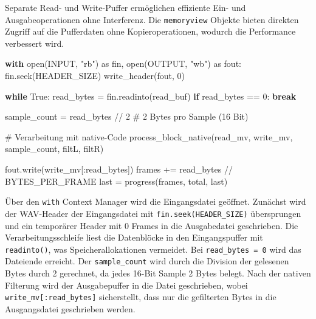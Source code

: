 \documentclass[
  ngerman,
  letterpaper,
  DIV=11]{scrreprt}
\newenvironment{Shaded}{\begin{snugshade}}{\end{snugshade}}
\newcommand{\BuiltInTok}[1]{\textcolor[rgb]{0.00,0.23,0.31}{#1}}
\newcommand{\CommentTok}[1]{\textcolor[rgb]{0.37,0.37,0.37}{#1}}
\newcommand{\ControlFlowTok}[1]{\textcolor[rgb]{0.00,0.23,0.31}{\textbf{#1}}}
\newcommand{\DecValTok}[1]{\textcolor[rgb]{0.68,0.00,0.00}{#1}}
\newcommand{\ImportTok}[1]{\textcolor[rgb]{0.00,0.46,0.62}{#1}}
\newcommand{\NormalTok}[1]{\textcolor[rgb]{0.00,0.23,0.31}{#1}}
\newcommand{\OperatorTok}[1]{\textcolor[rgb]{0.37,0.37,0.37}{#1}}
\newcommand{\StringTok}[1]{\textcolor[rgb]{0.13,0.47,0.30}{#1}}
\newcommand{\VariableTok}[1]{\textcolor[rgb]{0.07,0.07,0.07}{#1}}
\begin{document}
Separate Read- und Write-Puffer ermöglichen effiziente Ein- und
Ausgabeoperationen ohne Interferenz. Die \texttt{memoryview} Objekte
bieten direkten Zugriff auf die Pufferdaten ohne Kopieroperationen,
wodurch die Performance verbessert wird.

\begin{Shaded}
\begin{Highlighting}[]
\ControlFlowTok{with} \BuiltInTok{open}\NormalTok{(INPUT, }\StringTok{"rb"}\NormalTok{) }\ImportTok{as}\NormalTok{ fin, }\BuiltInTok{open}\NormalTok{(OUTPUT, }\StringTok{"wb"}\NormalTok{) }\ImportTok{as}\NormalTok{ fout:}
\NormalTok{    fin.seek(HEADER\_SIZE)}
\NormalTok{    write\_header(fout, }\DecValTok{0}\NormalTok{)}

    \ControlFlowTok{while} \VariableTok{True}\NormalTok{:}
\NormalTok{        read\_bytes }\OperatorTok{=}\NormalTok{ fin.readinto(read\_buf)}
        \ControlFlowTok{if}\NormalTok{ read\_bytes }\OperatorTok{==} \DecValTok{0}\NormalTok{:}
            \ControlFlowTok{break}

\NormalTok{        sample\_count }\OperatorTok{=}\NormalTok{ read\_bytes }\OperatorTok{//} \DecValTok{2}  \CommentTok{\# 2 Bytes pro Sample (16 Bit)}

        \CommentTok{\# Verarbeitung mit native{-}Code}
\NormalTok{        process\_block\_native(read\_mv, write\_mv, sample\_count, filtL, filtR)}

\NormalTok{        fout.write(write\_mv[:read\_bytes])}
\NormalTok{        frames }\OperatorTok{+=}\NormalTok{ read\_bytes }\OperatorTok{//}\NormalTok{ BYTES\_PER\_FRAME}
\NormalTok{        last }\OperatorTok{=}\NormalTok{ progress(frames, total, last)}
\end{Highlighting}
\end{Shaded}

Über den \texttt{with} Context Manager wird die Eingangsdatei geöffnet.
Zunächst wird der WAV-Header der Eingangsdatei mit
\texttt{fin.seek(HEADER\_SIZE)} übersprungen und ein temporärer Header
mit 0 Frames in die Ausgabedatei geschrieben. Die Verarbeitungsschleife
liest die Datenblöcke in den Eingangspuffer mit \texttt{readinto()}, was
Speicherallokationen vermeidet. Bei \texttt{read\_bytes\ =\ 0} wird das
Dateiende erreicht. Der \texttt{sample\_count} wird durch die Division
der gelesenen Bytes durch 2 gerechnet, da jedes 16-Bit Sample 2 Bytes
belegt. Nach der nativen Filterung wird der Ausgabepuffer in die Datei
geschrieben, wobei \texttt{write\_mv{[}:read\_bytes{]}} sicherstellt,
dass nur die gefilterten Bytes in die Ausgangsdatei geschrieben werden.
\end{document}
